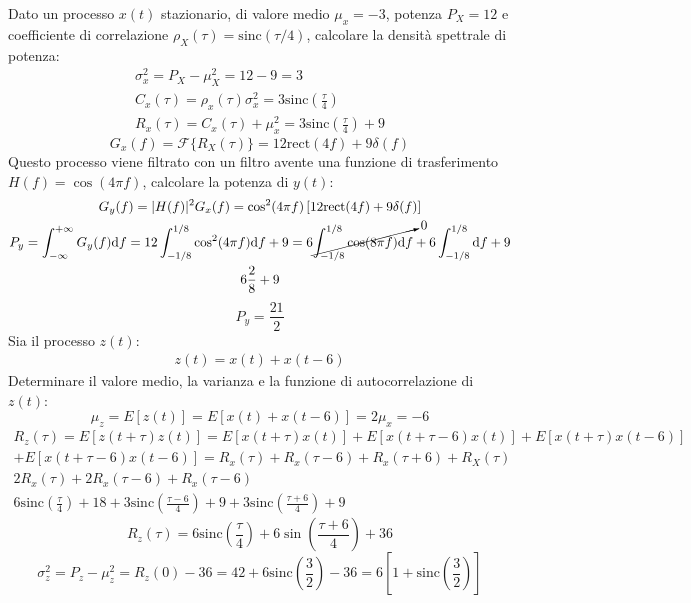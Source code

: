 \documentclass{article}
\newcommand{\rect}{\mathrm{rect}}
\newcommand{\sinc}{\mathrm{sinc}}
\newcommand{\df}{\mathrm{d}}
\begin{document}
Dato un processo $x(t)$ stazionario, di valore medio $\mu_x=-3$, potenza $P_X=12$ e coefficiente di correlazione $\rho_X(\tau)=\sinc(\tau/4)$, calcolare la densità spettrale 
di potenza:
\begin{gather*}
    \sigma_x^2=P_X-\mu_X^2=12-9=3\\
    C_x(\tau)=\rho_x(\tau)\sigma_x^2=3\sinc\displaystyle\left(\frac{\tau}{4}\right)\\
    R_x(\tau)=C_x(\tau)+\mu_x^2=3\sinc\displaystyle\left(\frac{\tau}{4}\right)+9
\end{gather*}
\begin{equation}
    G_x(f)=\mathscr{F}\{R_X(\tau)\}=12\rect(4f)+9\delta(f)
\end{equation}
Questo processo viene filtrato con un filtro avente una funzione di trasferimento $H(f)=\cos(4\pi f)$, calcolare la potenza 
di $y(t)$:
\begin{gather*}
    G_y(f)=|H(f)|^2G_x(f)=\cos^2(4\pi f)\left[12\rect(4f)+9\delta(f)\right]\\
    P_y=\displaystyle\int_{-\infty}^{+\infty}G_y(f)\df f=12\int_{-1/8}^{1/8}\cos^2(4\pi f)\df f+9=6\cancelto{0}{\int_{-1/8}^{1/8}\cos(8\pi f)\df f}+6\int_{-1/8}^{1/8}\df f+9\\
    \displaystyle6\frac{2}{8}+9
\end{gather*}
\begin{equation}
    P_y=\displaystyle\frac{21}{2}
\end{equation}
Sia il processo $z(t)$:
\begin{gather*}
    z(t)=x(t)+x(t-6)
\end{gather*}
Determinare il valore medio, la varianza e la funzione di autocorrelazione di $z(t)$:
\begin{equation}
    \mu_z=E[z(t)]=E[x(t)+x(t-6)]=2\mu_x=-6
\end{equation}
\begin{gather*}
    R_z(\tau)=E[z(t+\tau)z(t)]=E[x(t+\tau)x(t)]+E[x(t+\tau-6)x(t)]+E[x(t+\tau)x(t-6)]\\
    +E[x(t+\tau-6)x(t-6)]=R_x(\tau)+R_x(\tau-6)+R_x(\tau+6)+R_X(\tau)\\
    2R_x(\tau)+2R_x(\tau-6)+R_x(\tau-6)\\
    6\sinc\displaystyle\left(\frac{\tau}{4}\right)+18+3\sinc\left(\frac{\tau-6}{4}\right)+9+3\sinc\left(\frac{\tau+6}{4}\right)+9
\end{gather*}
\begin{equation}
    R_z(\tau)=6\sinc\left(\displaystyle\frac{\tau}{4}\right)+6\sin\left(\frac{\tau+6}{4}\right)+36
\end{equation}
\begin{equation}
    \sigma_z^2=P_z-\mu_z^2=R_z(0)-36=42+6\sinc\displaystyle\left(\frac{3}{2}\right)-36=6\left[1+\sinc\left(\frac{3}{2}\right)\right]
\end{equation}  
\end{document}
